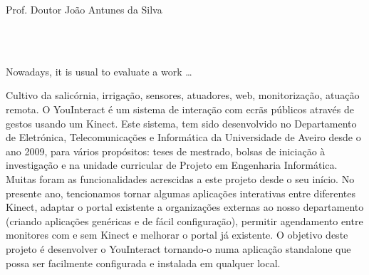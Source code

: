   \vspace*{5mm}    
{Prof. Doutor João Antunes da Silva 
\\ \\ 
\vspace*{5mm}

}


\EndTitlePage
\titlepage\
\endtitlepage %





\TitlePage
 \vspace*{55mm}
       {Nowadays, it is usual to evaluate a work \ldots}
\EndTitlePage
\titlepage\
\endtitlepage %




\TitlePage
  \vspace*{55mm}
       {Cultivo da salicórnia, irrigação, sensores, atuadores, web, monitorização, atuação remota.}
  \vspace*{5mm}
  \TEXT{\textbf{Resumo}}
       {O YouInteract é um sistema de interação com ecrãs públicos através de gestos usando um Kinect. Este sistema, tem sido desenvolvido no Departamento de Eletrónica, Telecomunicações e Informática da Universidade de Aveiro desde o ano 2009, para vários propósitos: teses de mestrado, bolsas de iniciação à investigação e na unidade curricular de Projeto em Engenharia Informática.}
	\TEXT{}
    {Muitas foram as funcionalidades acrescidas a este projeto desde o seu início. No presente ano, tencionamos tornar algumas aplicações interativas entre diferentes Kinect, adaptar o portal existente a organizações externas ao nosso departamento (criando aplicações genéricas e de fácil configuração), permitir agendamento entre monitores com e sem Kinect e melhorar o portal já existente.}  
	\TEXT{}     
   {O objetivo deste projeto é desenvolver o YouInteract tornando-o numa aplicação standalone que possa ser facilmente configurada e instalada em qualquer local. }


